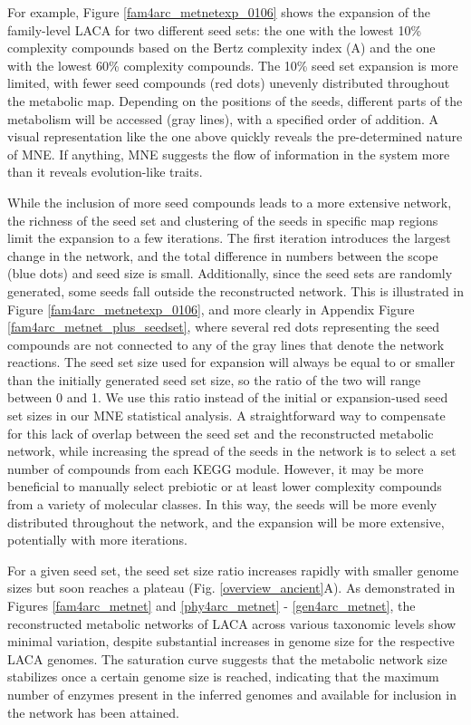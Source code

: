 For example, Figure \ref{fam4arc_metnetexp_0106} shows the expansion of the family-level LACA for two different seed sets: the one with the lowest 10\% complexity compounds based on the Bertz complexity index (A) and the one with the lowest 60\% complexity compounds. The 10\% seed set expansion is more limited, with fewer seed compounds (red dots) unevenly distributed throughout the metabolic map. Depending on the positions of the seeds, different parts of the metabolism will be accessed (gray lines), with a specified order of addition. A visual representation like the one above quickly reveals the pre-determined nature of MNE. If anything, MNE suggests the flow of information in the system more than it reveals evolution-like traits.

While the inclusion of more seed compounds leads to a more extensive network, the richness of the seed set and clustering of the seeds in specific map regions limit the expansion to a few iterations. The first iteration introduces the largest change in the network, and the total difference in numbers between the scope (blue dots) and seed size is small. Additionally, since the seed sets are randomly generated, some seeds fall outside the reconstructed network. This is illustrated in Figure \ref{fam4arc_metnetexp_0106}, and more clearly in Appendix Figure \ref{fam4arc_metnet_plus_seedset}, where several red dots representing the seed compounds are not connected to any of the gray lines that denote the network reactions. The seed set size used for expansion will always be equal to or smaller than the initially generated seed set size, so the ratio of the two will range between 0 and 1. We use this ratio instead of the initial or expansion-used seed set sizes in our MNE statistical analysis. A straightforward way to compensate for this lack of overlap between the seed set and the reconstructed metabolic network, while increasing the spread of the seeds in the network is to select a set number of compounds from each KEGG module. However, it may be more beneficial to manually select prebiotic or at least lower complexity compounds from a variety of molecular classes. In this way, the seeds will be more evenly distributed throughout the network, and the expansion will be more extensive, potentially with more iterations.

For a given seed set, the seed set size ratio increases rapidly with smaller genome sizes but soon reaches a plateau (Fig. \ref{overview_ancient}A). As demonstrated in Figures \ref{fam4arc_metnet} and \ref{phy4arc_metnet} - \ref{gen4arc_metnet}, the reconstructed metabolic networks of LACA across various taxonomic levels show minimal variation, despite substantial increases in genome size for the respective LACA genomes. The saturation curve suggests that the metabolic network size stabilizes once a certain genome size is reached, indicating that the maximum number of enzymes present in the inferred genomes and available for inclusion in the network has been attained. 

